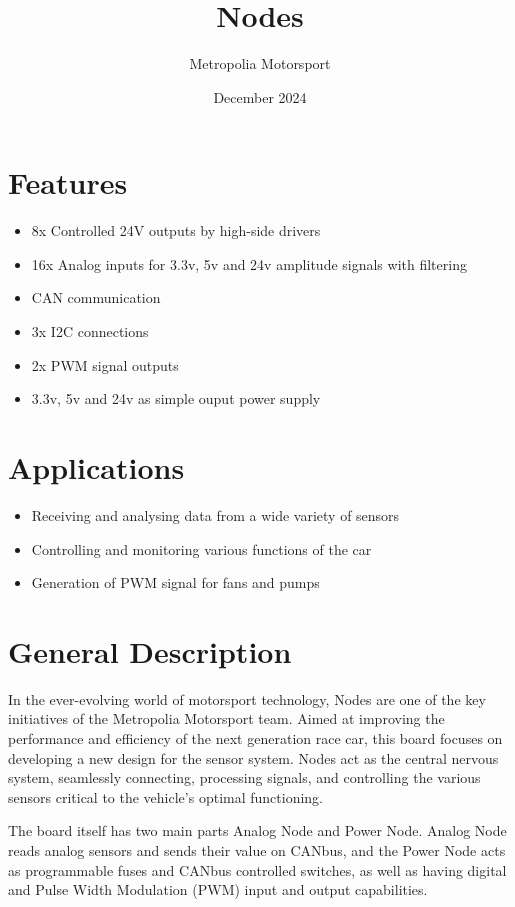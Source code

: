 \documentclass[10pt]{datasheet}
\title{Nodes}
\author{Metropolia Motorsport}
\date{December 2024}
\begin{document}
\maketitle

\section{Features}

\begin{itemize}
\item{8x Controlled 24V outputs by high-side drivers}
\item{16x Analog inputs for 3.3v, 5v and 24v amplitude signals with filtering}
\item{CAN communication}
\item {3x I2C connections}
\item {2x PWM signal outputs}
\item {3.3v, 5v and 24v as simple ouput power supply}
\end{itemize}

\section{Applications}

\begin{itemize}
\item{Receiving and analysing data from a wide variety of sensors}
\item {Controlling and monitoring various functions of the car}
\item{Generation of PWM signal for fans and pumps}
\end{itemize}

\section{General Description}
In the ever-evolving world of motorsport technology, Nodes are one of the key initiatives of the Metropolia Motorsport team. Aimed at improving the performance and efficiency of the next generation race car, this board focuses on developing a new design for the sensor system. Nodes act as the central nervous system, seamlessly connecting, processing signals, and controlling the various sensors critical to the vehicle's optimal functioning.

The board itself has two main parts Analog Node and Power Node. Analog Node reads analog sensors and sends their value on CANbus, and the Power Node acts as programmable fuses and CANbus controlled switches, as well as having digital and Pulse Width Modulation (PWM) input and output capabilities.
\end{document}
